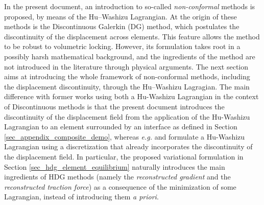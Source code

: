 In the present document, an introduction to so-called
\textit{non-conformal} methods is proposed, by means of the Hu–Washizu Lagrangian.
At the origin of these methods is the Discontinuous Galerkin (DG)
method, which postulates the discontinuity of the displacement across
elements. This feature allows the method to be robust to volumetric
locking. However, its formulation takes root in a possibly harsh
mathematical background, and the ingredients of the method are not
introduced in the literature through physical arguments. The
next section aims at introducing the whole framework of non-conformal
methods, including the displacement discontinuity, through the
Hu–Washizu Lagragian.
The main difference with former works using both a Hu-Washizu Lagrangian in the context of Discontinuous methods is that the present document
introduces the discontinuity of the displacement field from the application of the Hu-Washizu Lagrangian to an element surrounded by an interface as defined in Section \ref{sec_appendix_composite_demo},
whereas \textit{e.g.} \cite{noels_general_2006} and \cite{neunteufel_three-field_2021} formulate a Hu-Washizu Lagrangian using a discretization that already incorporates the discontinuity of the displacement field.
In particular, the proposed variational formulation in Section \ref{sec_hdg_element_equilibrium} naturally introduces the main ingredients of HDG methods (namely the \textit{reconstructed gradient} and the \textit{reconstructed traction force}) as a consequence of the minimization of some Lagrangian, instead of introducing them \textit{a priori}.







